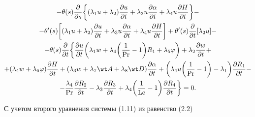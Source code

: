 \begin{multline} 


-\theta(s)\frac{\partial}{\partial s}\bigg\{ 


(\lambda_1u+\lambda_2)\frac{\partial u}{\partial t}+ 


\lambda_3u\frac{\partial\alpha}{\partial t}+ 


\lambda_4u\frac{\partial H}{\partial t}\bigg\}- \\ 


% 


-\theta'(s)\bigg[(\lambda_1u+\lambda_2) 


\frac{\partial u}{\partial t}+\lambda_3u 


\frac{\partial\alpha}{\partial t}+\lambda_4u 


\frac{\partial H}{\partial t}\bigg]+\theta'(s) 


\frac{\partial}{\partial t}[\lambda_2u]- \\ 


% 


-\theta(s)\frac{\partial}{\partial t}\bigg\{ 


\frac{\partial u}{\partial t}\bigg(\lambda_1w+\lambda_4 


\bigg(\frac{1}{\PR}-1\bigg)R_1+\lambda_5\varphi\bigg)+ 


\lambda_2\frac{\partial w}{\partial t}+ \\ 


% 


+(\lambda_4w+\lambda_6\varphi)\frac{\partial H}{\partial t}+ 


(\lambda_3w+\lambda_7\wt A+\lambda_8\wt D) 


\frac{\partial\alpha}{\partial t}+\bigg(\lambda_4u 


\bigg(\frac{1}{\PR}-1\bigg)-\lambda_1\bigg) 


\frac{\partial R_1}{\partial t}- \\ 


% 


-\frac{\lambda_4}{\PR}\frac{\partial R_2}{\partial t}- 


\lambda_3\frac{\partial R_3}{\partial t}+\lambda_4\bigg( 


\frac{1}{\Le}-1\bigg) 


\frac{\partial R_4}{\partial t}\bigg\}=0. 


\end{multline} 


С учетом второго уравнения системы (1.11) из \cite{2} равенство (2.2) 


